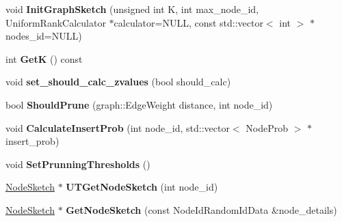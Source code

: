 \begin{DoxyCompactItemize}
\item 
\hypertarget{classall__distance__sketch_1_1GraphSketch_a400d1e090749a1bf2452c24cc6b8011e}{}void {\bfseries Init\+Graph\+Sketch} (unsigned int K, int max\+\_\+node\+\_\+id, Uniform\+Rank\+Calculator $\ast$calculator=N\+U\+L\+L, const std\+::vector$<$ int $>$ $\ast$nodes\+\_\+id=N\+U\+L\+L)\label{classall__distance__sketch_1_1GraphSketch_a400d1e090749a1bf2452c24cc6b8011e}

\item 
\hypertarget{classall__distance__sketch_1_1GraphSketch_a32fef9d13b965dd7b5a776596d888a41}{}int {\bfseries Get\+K} () const \label{classall__distance__sketch_1_1GraphSketch_a32fef9d13b965dd7b5a776596d888a41}

\item 
\hypertarget{classall__distance__sketch_1_1GraphSketch_a8d5aaa1b4e94e0361ea0b1afdbfcf8bc}{}void {\bfseries set\+\_\+should\+\_\+calc\+\_\+zvalues} (bool should\+\_\+calc)\label{classall__distance__sketch_1_1GraphSketch_a8d5aaa1b4e94e0361ea0b1afdbfcf8bc}

\item 
\hypertarget{classall__distance__sketch_1_1GraphSketch_afcb9c618075afba4f3eb577e883d014e}{}bool {\bfseries Should\+Prune} (graph\+::\+Edge\+Weight distance, int node\+\_\+id)\label{classall__distance__sketch_1_1GraphSketch_afcb9c618075afba4f3eb577e883d014e}

\item 
\hypertarget{classall__distance__sketch_1_1GraphSketch_a20cd1f2b7bae03eec392d9b1b608db55}{}void {\bfseries Calculate\+Insert\+Prob} (int node\+\_\+id, std\+::vector$<$ Node\+Prob $>$ $\ast$insert\+\_\+prob)\label{classall__distance__sketch_1_1GraphSketch_a20cd1f2b7bae03eec392d9b1b608db55}

\item 
\hypertarget{classall__distance__sketch_1_1GraphSketch_a98d608f3c2eb8a12cfd997d7e8f69805}{}void {\bfseries Set\+Prunning\+Thresholds} ()\label{classall__distance__sketch_1_1GraphSketch_a98d608f3c2eb8a12cfd997d7e8f69805}

\item 
\hypertarget{classall__distance__sketch_1_1GraphSketch_a1e701218b3a5147e14dd43881a6588a3}{}\hyperlink{classall__distance__sketch_1_1NodeSketch}{Node\+Sketch} $\ast$ {\bfseries U\+T\+Get\+Node\+Sketch} (int node\+\_\+id)\label{classall__distance__sketch_1_1GraphSketch_a1e701218b3a5147e14dd43881a6588a3}

\item 
\hypertarget{classall__distance__sketch_1_1GraphSketch_ad0b0931712a19b47983a24ef73500316}{}\hyperlink{classall__distance__sketch_1_1NodeSketch}{Node\+Sketch} $\ast$ {\bfseries Get\+Node\+Sketch} (const Node\+Id\+Random\+Id\+Data \&node\+\_\+details)\label{classall__distance__sketch_1_1GraphSketch_ad0b0931712a19b47983a24ef73500316}


\end{DoxyCompactItemize}

